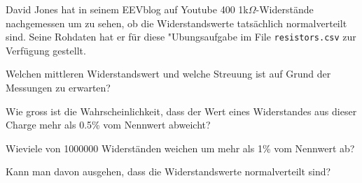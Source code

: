David Jones hat in seinem EEVblog auf Youtube 400 1k$\Omega$-Widerstände
nachgemessen um zu sehen, ob die Widerstandswerte tatsächlich normalverteilt
sind. Seine Rohdaten hat er für diese "Ubungsaufgabe im File
\verb+resistors.csv+ zur Verfügung gestellt.
\begin{teilaufgaben}
\item Welchen mittleren Widerstandswert und welche Streuung ist auf Grund
der Messungen zu erwarten?
\item Wie gross ist die Wahrscheinlichkeit, dass der Wert eines Widerstandes
aus dieser Charge mehr als 0.5\% vom Nennwert abweicht?
\item Wieviele von 1000000 Widerständen weichen um mehr als 1\% vom
Nennwert ab?
\item Kann man davon ausgehen, dass die Widerstandswerte normalverteilt sind?
\end{teilaufgaben}

